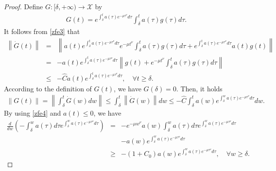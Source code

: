 \documentclass[review]{elsarticle}
\begin{document}
	\begin{proof}
		Define $G : [\delta, +\infty)\rightarrow  \mathcal{X}$ by 
		\begin{eqnarray*}
			G(t)=e^{\int_{\delta}^{t}a(\tau)e^{-\mu\tau^{\nu}}d\tau}\int_{\delta}^{t}a(\tau)g(\tau)d\tau.
		\end{eqnarray*}
		It follows from \eqref{zfe3}  that
		\begin{eqnarray*}
			\left\|\dot{G}(t)\right\|&=&\left\|a(t)e^{\int_{\delta}^{t}a(\tau)e^{-\mu\tau^{\nu}}d\tau}e^{-\mu t^{\nu}}\int_{\delta}^{t}a(\tau)g(\tau)d\tau+e^{\int_{\delta}^{t}a(\tau)e^{-\mu\tau^{\nu}}d\tau}a(t)g(t)\right\|\\
			&=&-a(t)e^{\int_{\delta}^{t}a(\tau)e^{-\mu\tau^{\nu}}d\tau}\left\|g(t)+e^{-\mu t^{\nu}}\int_{\delta}^{t}a(\tau)g(\tau)d\tau\right\|\\
			&\leq&-\widehat{C}a(t)e^{\int_{\delta}^{t}a(\tau)e^{-\mu\tau^{\nu}}d\tau}, \quad \forall t\geq \delta.
		\end{eqnarray*}
		According to the definition of $G(t)$, we have $G(\delta)=0$. Then, it holds 
		\begin{eqnarray}\label{zfe5}
			\left\|G(t)\right\|=\left\|\int_{\delta}^{t}\dot{G}(w)dw\right\|\leq\int_{\delta}^{t}\left\|\dot{G}(w)\right\|dw\leq-\widehat{C}\int_{\delta}^{t}a(w)e^{\int_{\delta}^{w}a(\tau)e^{-\mu\tau^{\nu}}d\tau}dw.
		\end{eqnarray}
		By using \eqref{zfe4} and $a(t)\leq0$, we have  
		\begin{eqnarray*}
			\frac{d}{dw}\left(-\int_{\delta}^{w}a(\tau)d\tau e^{\int_{\delta}^{w}a(\tau)e^{-\mu\tau^{\nu}}d\tau}\right)&=&
			-e^{-\mu w^{\nu}}a(w)\int_{\delta}^{w}a(\tau)d\tau e^{\int_{\delta}^{w}a(\tau)e^{-\mu\tau^{\nu}}d\tau}\\
			&&-a(w)e^{\int_{\delta}^{w}a(\tau)e^{-\mu\tau^{\nu}}d\tau}\\
			&\geq&-\left(1+C_0\right)a(w)e^{\int_{\delta}^{w}a(\tau)e^{-\mu\tau^{\nu}}d\tau}, \quad \forall w\geq \delta.
		\end{eqnarray*}

\end{proof}
\end{document}
